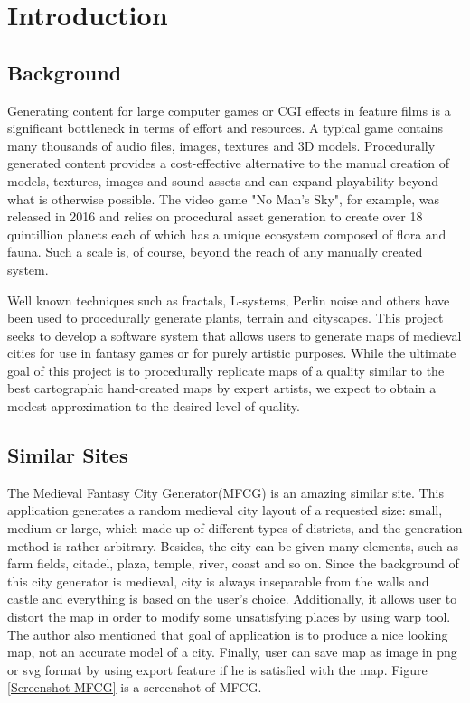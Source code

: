 \section{Introduction}
\label{sec:Introduction}

\subsection{Background}
Generating content for large computer games or CGI effects in feature films is a significant bottleneck in terms of effort and resources. A typical game contains many thousands of audio files, images, textures and 3D models. Procedurally generated content provides a cost-effective alternative to the manual creation of models, textures, images and sound assets and can expand playability beyond what is otherwise possible. The video game "No Man's Sky", for example, was released in 2016 and relies on procedural asset generation to create over 18 quintillion planets each of which has a unique ecosystem composed of flora and fauna. Such a scale is, of course, beyond the reach of any manually created system.

Well known techniques such as fractals, L-systems, Perlin noise and others have been used to procedurally generate plants, terrain and cityscapes. This project seeks to develop a software system that allows users to generate maps of medieval cities for use in fantasy games or for purely artistic purposes. While the ultimate goal of this project is to procedurally replicate maps of a quality similar to the best cartographic hand-created maps by expert artists, we expect to obtain a modest approximation to the desired level of quality.

\subsection{Similar Sites}
The Medieval Fantasy City Generator(MFCG) is an amazing similar site. This application generates a random medieval city layout of a requested size: small, medium or large, which made up of different types of districts, and the generation method is rather arbitrary. Besides, the city can be given many elements, such as farm fields, citadel, plaza, temple, river, coast and so on. Since the background of this city generator is medieval, city is always inseparable from the walls and castle and everything is based on the user's choice. Additionally, it allows user to distort the map in order to modify some unsatisfying places by using warp tool. The author also mentioned that goal of application is to produce a nice looking map, not an accurate model of a city. Finally, user can save map as image in png or svg format by using export feature if he is satisfied with the map. Figure \ref{Screenshot MFCG} is a screenshot of MFCG.

